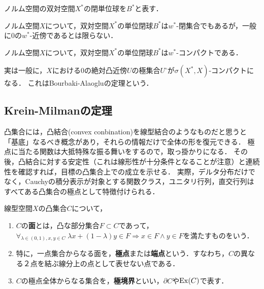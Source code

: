 \documentclass[uplatex,dvipdfmx]{jsreport}
\begin{document}
\begin{notation}
    ノルム空間の双対空間$X^*$の閉単位球を$B^*$と表す．
\end{notation}

\begin{lemma}
    ノルム空間$X$について，双対空間$X^*$の単位閉球$B^*$は$w^*$-閉集合でもあるが，一般に$0$の$w^*$-近傍であるとは限らない．
\end{lemma}

\begin{theorem}\label{thm-Alaoglu}
    ノルム空間$X$について，双対空間$X^*$の単位閉球$B^*$は$w^*$-コンパクトである．
\end{theorem}
\begin{remarks}
    実は一般に，$X$における$0$の絶対凸近傍$U$の極集合$U^\circ$が$\sigma(X^*,X)$-コンパクトになる．
    これはBourbaki-Alaogluの定理という．
\end{remarks}

\subsection{Krein-Milmanの定理}

\begin{tcolorbox}[colframe=ForestGreen, colback=ForestGreen!10!white,breakable,colbacktitle=ForestGreen!40!white,coltitle=black,fonttitle=\bfseries\sffamily,
title=コンパクト凸集合の代数的特徴付けを与える]
    凸集合には，凸結合(convex conbination)を線型結合のようなものだと思うと「基底」なるべき概念があり，それらの情報だけで全体の形を復元できる．
    極点に当たる関数は大抵特殊な振る舞いをするので，取っ掛かりになる．
    その後，凸結合に対する安定性（これは線形性が十分条件となることが注意）と連続性を確認すれば，目標の凸集合上での成立を示せる．
    実際，デルタ分布だけでなく，Cauchyの積分表示が対象とする関数クラス，ユニタリ行列，直交行列はすべてある凸集合の極点として特徴付けられる．
\end{tcolorbox}

\begin{definition}
    線型空間$X$の凸集合$C$について，
    \begin{enumerate}
        \item $C$の\textbf{面}とは，凸な部分集合$F\subset C$であって，$\forall_{\lambda\in(0,1),x,y\in C}\;\lambda x+(1-\lambda)y\in F\Rightarrow x\in F\land y\in F$を満たすものをいう．
        \item 特に，一点集合からなる面を，\textbf{極点}または\textbf{端点}という．すなわち，$C$の異なる２点を結ぶ線分上の点として表せない点である．
        \item $C$の極点全体からなる集合を，\textbf{極境界}といい，$\partial C$や$\mathrm{Ex}(C)$で表す．
    \end{enumerate}
\end{definition}
\end{document}
